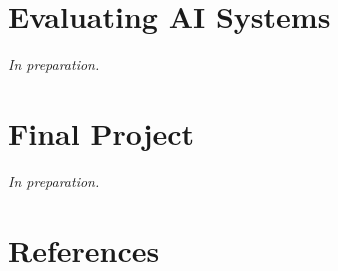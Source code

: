 \documentclass[
  a4paper,
]{scrbook}
\begin{document}
\chapter{Evaluating AI Systems}\label{evaluating-ai-systems}

\emph{In preparation.}

\chapter{Final Project}\label{final-project}

\emph{In preparation.}


\chapter*{References}\label{references}

\end{document}
